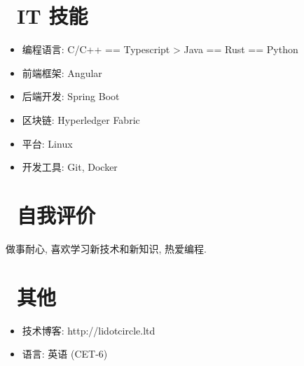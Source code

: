 \documentclass{resume}
\begin{document}

\section{\faCogs\ IT 技能}
\begin{itemize}[parsep=0.5ex]
  \item 编程语言: C/C++ == Typescript > Java == Rust == Python
  \item 前端框架: Angular
  \item 后端开发: Spring Boot
  \item 区块链: Hyperledger Fabric
  \item 平台: Linux
  \item 开发工具: Git, Docker
\end{itemize}

\section{\faArrowCircleRight\ 自我评价}
做事耐心, 喜欢学习新技术和新知识, 热爱编程.

\section{\faInfo\ 其他}
\begin{itemize}[parsep=0.5ex]
  \item 技术博客: http://lidotcircle.ltd
  \item 语言: 英语 (CET-6)
\end{itemize}

%
%
\end{document}
